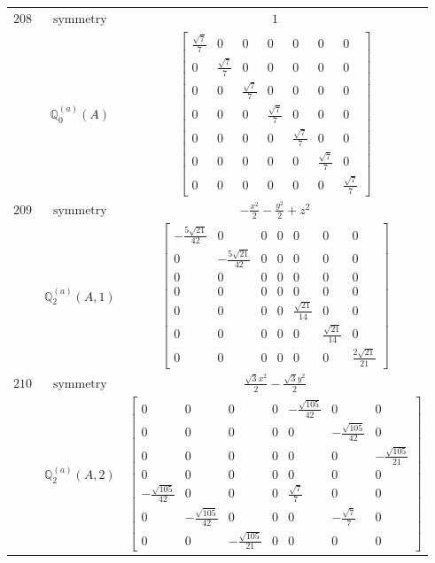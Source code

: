 \documentclass[fleqn,8pt,landscape]{jsarticle}
\begin{document}
\begin{longtable}{ccc}
$ 208 $ & $ \text{symmetry} $ & $ 1 $ \\
$  $ & $ \mathbb{Q}_{0}^{(a)}(A) $ & $ \begin{bmatrix} \frac{\sqrt{7}}{7} & 0 & 0 & 0 & 0 & 0 & 0 \\ 0 & \frac{\sqrt{7}}{7} & 0 & 0 & 0 & 0 & 0 \\ 0 & 0 & \frac{\sqrt{7}}{7} & 0 & 0 & 0 & 0 \\ 0 & 0 & 0 & \frac{\sqrt{7}}{7} & 0 & 0 & 0 \\ 0 & 0 & 0 & 0 & \frac{\sqrt{7}}{7} & 0 & 0 \\ 0 & 0 & 0 & 0 & 0 & \frac{\sqrt{7}}{7} & 0 \\ 0 & 0 & 0 & 0 & 0 & 0 & \frac{\sqrt{7}}{7} \end{bmatrix} $ \\ \hline
$ 209 $ & $ \text{symmetry} $ & $ - \frac{x^{2}}{2} - \frac{y^{2}}{2} + z^{2} $ \\
$  $ & $ \mathbb{Q}_{2}^{(a)}(A,1) $ & $ \begin{bmatrix} - \frac{5 \sqrt{21}}{42} & 0 & 0 & 0 & 0 & 0 & 0 \\ 0 & - \frac{5 \sqrt{21}}{42} & 0 & 0 & 0 & 0 & 0 \\ 0 & 0 & 0 & 0 & 0 & 0 & 0 \\ 0 & 0 & 0 & 0 & 0 & 0 & 0 \\ 0 & 0 & 0 & 0 & \frac{\sqrt{21}}{14} & 0 & 0 \\ 0 & 0 & 0 & 0 & 0 & \frac{\sqrt{21}}{14} & 0 \\ 0 & 0 & 0 & 0 & 0 & 0 & \frac{2 \sqrt{21}}{21} \end{bmatrix} $ \\ \hline
$ 210 $ & $ \text{symmetry} $ & $ \frac{\sqrt{3} x^{2}}{2} - \frac{\sqrt{3} y^{2}}{2} $ \\
$  $ & $ \mathbb{Q}_{2}^{(a)}(A,2) $ & $ \begin{bmatrix} 0 & 0 & 0 & 0 & - \frac{\sqrt{105}}{42} & 0 & 0 \\ 0 & 0 & 0 & 0 & 0 & - \frac{\sqrt{105}}{42} & 0 \\ 0 & 0 & 0 & 0 & 0 & 0 & - \frac{\sqrt{105}}{21} \\ 0 & 0 & 0 & 0 & 0 & 0 & 0 \\ - \frac{\sqrt{105}}{42} & 0 & 0 & 0 & \frac{\sqrt{7}}{7} & 0 & 0 \\ 0 & - \frac{\sqrt{105}}{42} & 0 & 0 & 0 & - \frac{\sqrt{7}}{7} & 0 \\ 0 & 0 & - \frac{\sqrt{105}}{21} & 0 & 0 & 0 & 0 \end{bmatrix} $ \\ \hline

\end{longtable}
\end{document}

